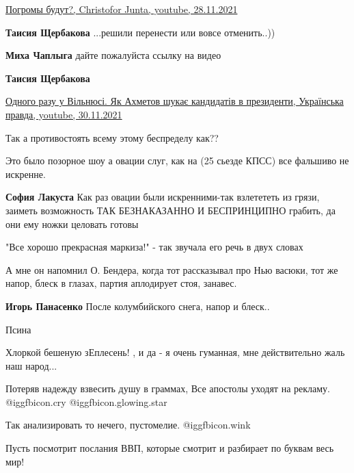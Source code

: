 \begin{itemize}
\begin{itemize}
\href{https://www.youtube.com/watch?v=b5Xpdc-WCgg}{%
Погромы будут?, Christofor Junta, youtube, 28.11.2021%
}

\textbf{Таисия Щербакова} ...решили перенести или вовсе отменить..))

\textbf{Миха Чаплыга} дайте пожалуйста ссылку на видео

\textbf{Таисия Щербакова} 

\href{https://youtu.be/jci47lqpMJU}{%
Одного разу у Вільнюсі. Як Ахметов шукає кандидатів в президенти, Українська правда, youtube, 30.11.2021%
}

\end{itemize} %

Так а противостоять всему этому беспределу как??

Это было позорное шоу а овации слуг, как на (25 сьезде КПСС) все фальшиво не искренне.

\begin{itemize} %
\textbf{София Лакуста} Как раз овации были искренними-так взлетететь из грязи, заиметь возможность ТАК БЕЗНАКАЗАННО И БЕСПРИНЦИПНО грабить, да они ему ножки целовать готовы
\end{itemize} %

"Все хорошо прекрасная маркиза!" - так звучала его речь в двух словах

А мне он напомнил О. Бендера, когда тот рассказывал про Нью васюки, тот же напор, блеск в глазах, партия аплодирует стоя, занавес.

\begin{itemize} %
\textbf{Игорь Панасенко} После колумбийского снега, напор и блеск..
\end{itemize} %

Псина

Хлоркой бешеную зЕплесень! , и да - я очень гуманная, мне действительно жаль наш народ...

Потеряв надежду взвесить душу в граммах,
Все апостолы уходят на рекламу. @igg{fbicon.cry}  @igg{fbicon.glowing.star} 

Так анализировать то нечего, пустомелие.  @igg{fbicon.wink} 

Пусть посмотрит послания ВВП, которые смотрит и разбирает по буквам весь мир!


\end{itemize}
